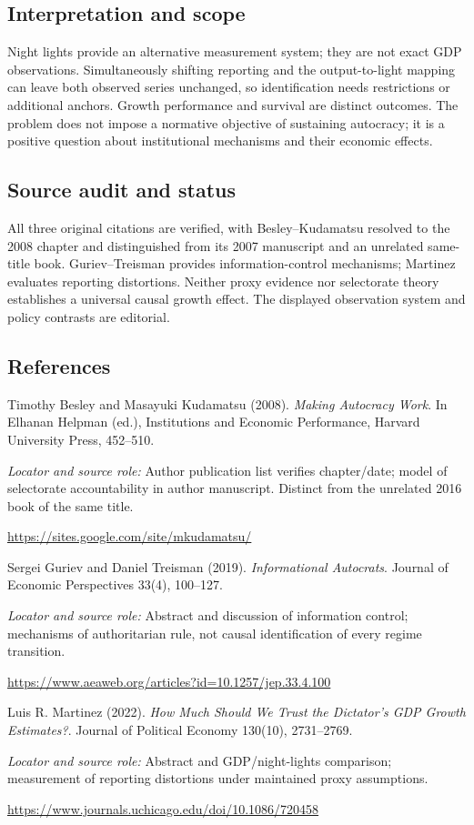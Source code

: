 \documentclass[11pt,a4paper]{article}
\begin{document}
\subsection*{Interpretation and scope}
Night lights provide an alternative measurement system; they are not exact GDP observations. Simultaneously shifting reporting and the output-to-light mapping can leave both observed series unchanged, so identification needs restrictions or additional anchors. Growth performance and survival are distinct outcomes. The problem does not impose a normative objective of sustaining autocracy; it is a positive question about institutional mechanisms and their economic effects.
\subsection*{Source audit and status}
All three original citations are verified, with Besley--Kudamatsu resolved to the 2008 chapter and distinguished from its 2007 manuscript and an unrelated same-title book. Guriev--Treisman provides information-control mechanisms; Martinez evaluates reporting distortions. Neither proxy evidence nor selectorate theory establishes a universal causal growth effect. The displayed observation system and policy contrasts are editorial.
\subsection*{References}
{\footnotesize\raggedright
\begin{enumerate}[label={\textbf{[S\arabic*]}},leftmargin=3em]
\item Timothy Besley and Masayuki Kudamatsu (2008). \emph{Making Autocracy Work}. In Elhanan Helpman (ed.), Institutions and Economic Performance, Harvard University Press, 452--510.\par
\textit{Locator and source role:} Author publication list verifies chapter/date; model of selectorate accountability in author manuscript. Distinct from the unrelated 2016 book of the same title.\par
\url{https://sites.google.com/site/mkudamatsu/}
\item Sergei Guriev and Daniel Treisman (2019). \emph{Informational Autocrats}. Journal of Economic Perspectives 33(4), 100--127.\par
\textit{Locator and source role:} Abstract and discussion of information control; mechanisms of authoritarian rule, not causal identification of every regime transition.\par
\url{https://www.aeaweb.org/articles?id=10.1257/jep.33.4.100}
\item Luis R. Martinez (2022). \emph{How Much Should We Trust the Dictator's GDP Growth Estimates?}. Journal of Political Economy 130(10), 2731--2769.\par
\textit{Locator and source role:} Abstract and GDP/night-lights comparison; measurement of reporting distortions under maintained proxy assumptions.\par
\url{https://www.journals.uchicago.edu/doi/10.1086/720458}
\end{enumerate}
}
\end{document}
